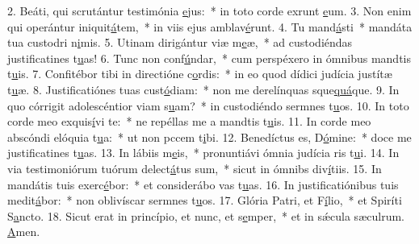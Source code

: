 2. Beáti, qui scrutántur testimónia \uline{e}jus:~* in toto corde exrunt \uline{e}um.
3. Non enim qui operántur iniquit\uline{á}tem,~* in viis ejus amblav\uline{é}runt.
4. Tu mand\uline{á}sti~* mandáta tua custodri n\uline{i}mis.
5. Utinam dirigántur viæ m\uline{e}æ,~* ad custodiéndas justificatines t\uline{u}as!
6. Tunc non conf\uline{ú}ndar,~* cum perspéxero in ómnibus mandtis t\uline{u}is.
7. Confitébor tibi in directióne c\uline{o}rdis:~* in eo quod dídici judícia justítæ t\uline{u}æ.
8. Justificatiónes tuas cust\uline{ó}diam:~* non me derelínquas sque\uline{quá}que.
9. In quo córrigit adolescéntior viam s\uline{u}am?~* in custodiéndo sermnes t\uline{u}os.
10. In toto corde meo exquis\uline{í}vi te:~* ne repéllas me a mandtis t\uline{u}is.
11. In corde meo abscóndi elóquia t\uline{u}a:~* ut non pccem t\uline{i}bi.
12. Benedíctus es, D\uline{ó}mine:~* doce me justificatines t\uline{u}as.
13. In lábiis m\uline{e}is,~* pronuntiávi ómnia judícia ris t\uline{u}i.
14. In via testimoniórum tuórum delect\uline{á}tus sum,~* sicut in ómnibs div\uline{í}tiis.
15. In mandátis tuis exerc\uline{é}bor:~* et considerábo vas t\uline{u}as.
16. In justificatiónibus tuis medit\uline{á}bor:~* non oblivíscar sermnes t\uline{u}os.
17. Glória Patri, et F\uline{í}lio,~* et Spiríti S\uline{a}ncto.
18. Sicut erat in princípio, et nunc, et s\uline{e}mper,~* et in sǽcula sæculrum. \uline{A}men.
